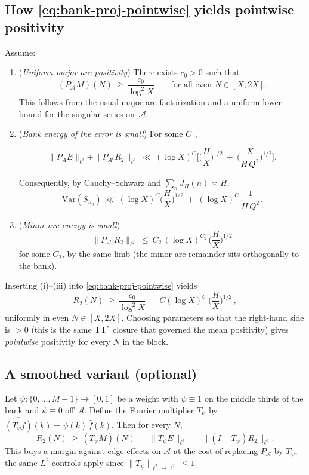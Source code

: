 \subsection*{How \eqref{eq:bank-proj-pointwise} yields pointwise positivity}
Assume:
\begin{enumerate}
\item[(i)] (\emph{Uniform major-arc positivity}) There exists $c_0>0$ such that
\[
(P_{\mathcal{A}}M)(N)\ \ge\ \frac{c_0}{\log^2 X}\qquad\text{for all even }N\in[X,2X].
\]
This follows from the usual major-arc factorization and a uniform lower bound for the singular series on~$\mathcal{A}$.

\item[(ii)] (\emph{Bank energy of the error is small}) For some $C_1$,

\begin{equation}\label{eq:routeB-L2}
\|P_AE\|_{\ell^2}+\|P_{A^c}R_2\|_{\ell^2}
\ \ll\ 
(\log X)^C\Bigg[
\Big(\frac{H}{X}\Big)^{1/2}
\ +\
\Big(\frac{X}{H\,Q^2}\Big)^{1/2}
\Bigg].
\end{equation}

\noindent
Consequently, by Cauchy–Schwarz and $\sum_n J_H(n)\asymp H$,
\begin{equation}\label{eq:routeB-to-variance}
\mathrm{Var}(S_{n_0})
\ \ll\ 
(\log X)^C\Big(\frac{H}{X}\Big)^{1/2}
\ +\ 
(\log X)^C\,\frac{1}{H\,Q^2}.
\end{equation}

\item[(iii)] (\emph{Minor-arc energy is small})
\[
\|P_{\mathcal{A}^c}R_2\|_{\ell^2}\ \le\ C_2\,(\log X)^{C_2}\,\Big(\frac{H}{X}\Big)^{1/2}
\]
for some $C_2$, by the same limb (the minor-arc remainder sits orthogonally to the bank).
\end{enumerate}
Inserting (i)–(iii) into \eqref{eq:bank-proj-pointwise} yields
\[
R_2(N)\ \ge\ \frac{c_0}{\log^2 X}\ -\ C(\log X)^{C}\,\Big(\frac{H}{X}\Big)^{1/2}\,,
\]
uniformly in even $N\in[X,2X]$. 
Choosing parameters so that the right-hand side is $>0$ (this is the same TT$^\ast$ closure that governed the mean positivity) gives \emph{pointwise} positivity for every $N$ in the block.

\subsection*{A smoothed variant (optional)}
Let $\psi:\{0,\dots,M-1\}\to[0,1]$ be a weight with $\psi\equiv 1$ on the middle thirds of the bank and $\psi\equiv 0$ off $\mathcal{A}$.
Define the Fourier multiplier $T_\psi$ by $\widehat{(T_\psi f)}(k)=\psi(k)\,\widehat f(k)$.
Then for every $N$,
\[
R_2(N)\ \ge\ (T_\psi M)(N)\ -\ \|T_\psi E\|_{\ell^2}\ -\ \|(I-T_\psi)R_2\|_{\ell^2}.
\]
This buys a margin against edge effects on $\mathcal{A}$ at the cost of replacing $P_{\mathcal{A}}$ by $T_\psi$; the same $L^2$ controls apply since $\|T_\psi\|_{\ell^2\to\ell^2}\le 1$.
\qedhere

